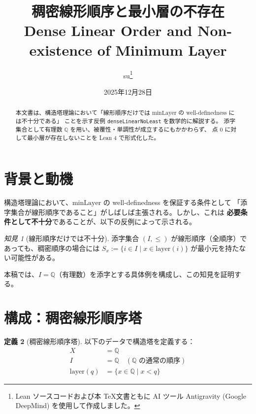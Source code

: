 \documentclass[a4paper,11pt]{ltjsarticle}
\title{%
    \textbf{稠密線形順序と最小層の不存在}\\[0.5em]
    \Large Dense Linear Order and Non-existence of Minimum Layer
}
\author{su\thanks{Lean ソースコードおよび本 \TeX 文書ともに AI ツール Antigravity (Google DeepMind) を使用して作成しました。}}
\date{2025年12月28日}
\theoremstyle{definition}
\newtheorem{definition}{定義}[section]
\theoremstyle{plain}
\theoremstyle{remark}
\newtheorem{insight}[definition]{知見}
\newcommand{\Q}{\mathbb{Q}}
\newcommand{\Layer}{\mathrm{layer}}
\newcommand{\minLayer}{\mathrm{minLayer}}
\begin{document}
\maketitle

\begin{abstract}
本文書は、構造塔理論において「線形順序だけでは $\minLayer$ の well-definedness には不十分である」
ことを示す反例 \texttt{denseLinearNoLeast} を数学的に解説する。
添字集合として有理数 $\Q$ を用い、被覆性・単調性が成立するにもかかわらず、
点 $0$ に対して最小層が存在しないことを Lean 4 で形式化した。
\end{abstract}

\tableofcontents

\newpage

\section{背景と動機}

構造塔理論において、$\minLayer$ の well-definedness を保証する条件として
「添字集合が線形順序であること」がしばしば主張される。しかし、これは
\textbf{必要条件として不十分}であることが、以下の反例によって示される。

\begin{insight}[線形順序だけでは不十分]
添字集合 $(I, \leq)$ が線形順序（全順序）であっても、稠密順序の場合には
$S_x := \{i \in I \mid x \in \Layer(i)\}$ が最小元を持たない可能性がある。
\end{insight}

本稿では、$I = \Q$（有理数）を添字とする具体例を構成し、この知見を証明する。

\section{構成：稠密線形順序塔}

\begin{definition}[稠密線形順序塔]
以下のデータで構造塔を定義する：
\begin{align*}
    X &= \Q \\
    I &= \Q \quad (\Q \text{ の通常の順序}) \\
    \Layer(q) &= \{x \in \Q \mid x < q\}
\end{align*}
\end{definition}
\end{document}
